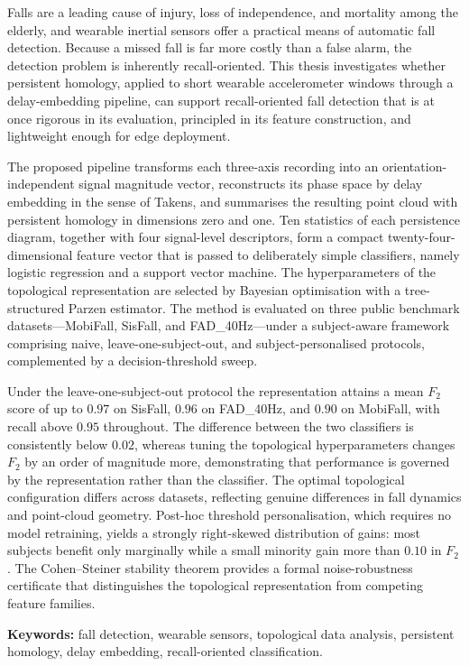 Falls are a leading cause of injury, loss of independence, and mortality among
the elderly, and wearable inertial sensors offer a practical means of automatic
fall detection. Because a missed fall is far more costly than a false alarm, the
detection problem is inherently recall-oriented. This thesis investigates whether
persistent homology, applied to short wearable accelerometer windows through a
delay-embedding pipeline, can support recall-oriented fall detection that is at
once rigorous in its evaluation, principled in its feature construction, and
lightweight enough for edge deployment.

The proposed pipeline transforms each three-axis recording into an
orientation-independent signal magnitude vector, reconstructs its phase space by
delay embedding in the sense of Takens, and summarises the resulting point cloud
with persistent homology in dimensions zero and one. Ten statistics of each
persistence diagram, together with four signal-level descriptors, form a compact
twenty-four-dimensional feature vector that is passed to deliberately simple
classifiers, namely logistic regression and a support vector machine. The
hyperparameters of the topological representation are selected by Bayesian
optimisation with a tree-structured Parzen estimator. The method is evaluated on
three public benchmark datasets---MobiFall, SisFall, and FAD\_40Hz---under a
subject-aware framework comprising naive, leave-one-subject-out, and
subject-personalised protocols, complemented by a decision-threshold sweep.

Under the leave-one-subject-out protocol the representation attains a mean
$F_2$ score of up to $0.97$ on SisFall, $0.96$ on FAD\_40Hz, and $0.90$ on
MobiFall, with recall above $0.95$ throughout. The difference between the two
classifiers is consistently below $0.02$, whereas tuning the topological
hyperparameters changes $F_2$ by an order of magnitude more, demonstrating that
performance is governed by the representation rather than the classifier. The
optimal topological configuration differs across datasets, reflecting genuine
differences in fall dynamics and point-cloud geometry. Post-hoc threshold
personalisation, which requires no model retraining, yields a strongly
right-skewed distribution of gains: most subjects benefit only marginally while a
small minority gain more than $0.10$ in $F_2$. The Cohen--Steiner stability
theorem provides a formal noise-robustness certificate that distinguishes the
topological representation from competing feature families.

\vspace{3mm}\noindent
\textbf{Keywords:} fall detection, wearable sensors, topological data analysis,
persistent homology, delay embedding, recall-oriented classification.
